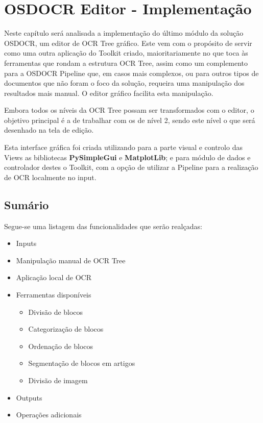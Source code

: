 \chapter{OSDOCR Editor - Implementação}
\label{cap_osdocr_editor_implementacao}



Neste capítulo será analisada a implementação do último módulo da solução OSDOCR, um editor de OCR Tree gráfico. Este vem com o propósito de servir como uma outra aplicação do Toolkit criado, maioritariamente no que toca às ferramentas que rondam a estrutura OCR Tree, assim como um complemento para a OSDOCR Pipeline que, em casos mais complexos, ou para outros tipos de documentos que não foram o foco da solução, requeira uma manipulação dos resultados mais manual. O editor gráfico facilita esta manipulação.

Embora todos os níveis da OCR Tree possam ser transformados com o editor, o objetivo principal é a de trabalhar com os de nível 2, sendo este nível o que será desenhado na tela de edição.

Esta interface gráfica foi criada utilizando para a parte visual e controlo das Views as bibliotecas \textbf{PySimpleGui} e \textbf{MatplotLib}; e para módulo de dados e controlador destes o Toolkit, com a opção de utilizar a Pipeline para a realização de OCR localmente no input.


\section{Sumário}

Segue-se uma listagem das funcionalidades que serão realçadas:

\begin{itemize}\setlength\itemsep{-0.8em}
	
	\item Inputs
	\item Manipulação manual de OCR Tree 
	\item Aplicação local de OCR
	\item Ferramentas disponíveis
		\begin{itemize}\setlength\itemsep{-0.8em}
			\item Divisão de blocos
			\item Categorização de blocos
			\item Ordenação de blocos
			\item Segmentação de blocos em artigos
			\item Divisão de imagem
		\end{itemize}
	\item Outputs
	\item Operações adicionais
\end{itemize}

